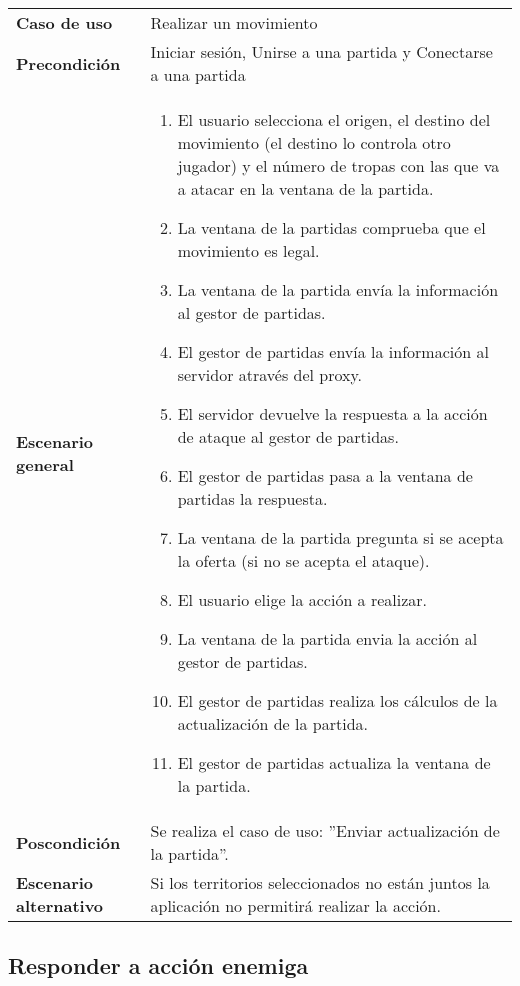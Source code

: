 {\footnotesize
\begin{tabularx}{0.95\textwidth}{p{}|X}

\textbf{Caso de uso} & Realizar un movimiento \\

\textbf{Precondición} & Iniciar sesión, Unirse a una partida y Conectarse a una
partida \\

\textbf{Escenario general} & \begin{enumerate}
\item El usuario selecciona el origen, el destino del movimiento (el destino
lo controla otro jugador) y el número de tropas con las que va a atacar en la
ventana de la partida.
\item La ventana de la partidas comprueba que el movimiento es legal.
\item La ventana de la partida envía la información al gestor de partidas.
\item El gestor de partidas envía la información al servidor através del proxy.
\item El servidor devuelve la respuesta a la acción de ataque al gestor de
partidas.
\item El gestor de partidas pasa a la ventana de partidas la respuesta.
\item La ventana de la partida pregunta si se acepta la oferta (si no se acepta
el ataque).
\item El usuario elige la acción a realizar.
\item La ventana de la partida envia la acción al gestor de partidas.
\item El gestor de partidas realiza los cálculos de la actualización de la
partida.
\item El gestor de partidas actualiza la ventana de la partida.
\end{enumerate} \\

\textbf{Poscondición} & Se realiza el caso de uso: ''Enviar actualización de la
partida''.\\

\textbf{Escenario alternativo} & Si los territorios seleccionados no están
juntos la aplicación no permitirá realizar la acción.

\end{tabularx}
}

\subsection{Responder a acción enemiga}

